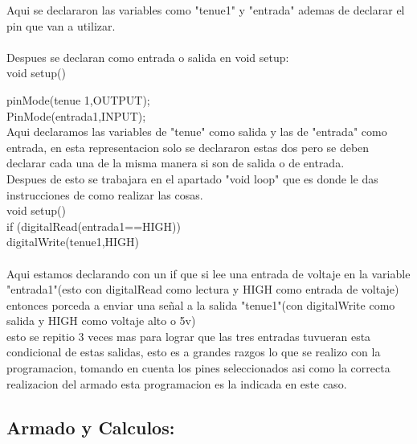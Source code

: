 \documentclass[12pt,a4paper]{article}
\begin{document}
 Aqui se declararon las variables como "tenue1" y "entrada" ademas de declarar el pin que van a utilizar.\\\\
 Despues se declaran como entrada o salida en void setup:\\
 void setup()\\{
 pinMode(tenue 1,OUTPUT);\\
 PinMode(entrada1,INPUT);\\
 
 Aqui declaramos las variables de "tenue" como salida y las de "entrada" como entrada, en esta representacion solo se declararon estas dos pero se deben declarar cada una de la misma manera si son de salida o de entrada.\\
 
 Despues de esto se trabajara en el apartado "void loop" que es donde le  das instrucciones de como realizar las cosas.\\
 void setup()\\{
 if (digitalRead(entrada1==HIGH))\\
 {digitalWrite(tenue1,HIGH)}\\
 }\\
 Aqui estamos declarando con un if que si lee una entrada de voltaje en la variable "entrada1"(esto con digitalRead como lectura y HIGH como entrada de voltaje) entonces porceda a enviar una señal a la salida "tenue1"(con digitalWrite como salida y HIGH como voltaje alto o 5v)\\
 esto se repitio 3 veces mas para lograr que las tres entradas tuvueran esta condicional de estas salidas, esto es a grandes razgos lo que se realizo con la programacion, tomando en cuenta los pines seleccionados asi como la correcta realizacion del armado esta programacion es la indicada  en este caso.
 
\subsection{Armado y Calculos:}

}
\end{document}
